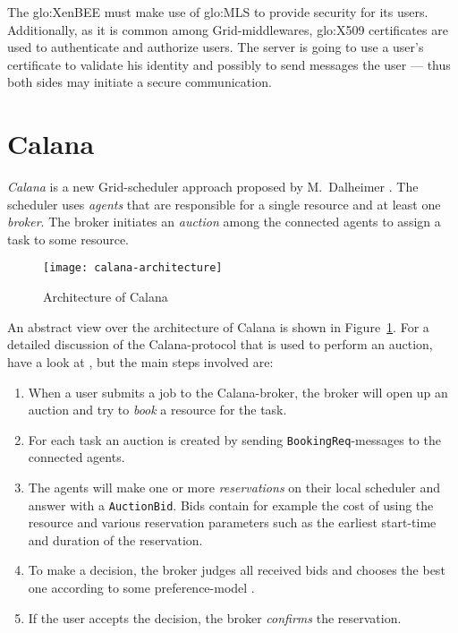 \bigskip

The \gls{glo:XenBEE}  must make use  of \gls{glo:MLS} to  provide security
for  its users.   Additionally, as  it is  common  among Grid-middlewares,
\gls{glo:X509}  certificates  are   used  to  authenticate  and  authorize
users. The  server is going  to use a  user's certificate to  validate his
identity and  possibly to send messages  the user --- thus  both sides may
initiate a secure communication.

\section{Calana}
\label{sec:calana}

\emph{Calana} is  a new  Grid-scheduler approach proposed  by M.~Dalheimer
\cite{dalheimer05agentbased}.  The  scheduler uses \emph{agents}  that are
responsible for  a single  resource and at  least one  \emph{broker}.  The
broker initiates an \emph{auction} among  the connected agents to assign a
task to some resource.

\begin{figure}[htbp]
  \centering
  \texttt{[image: calana-architecture]}
  \caption{Architecture of Calana}
  \label{fig:calana-architecture}
\end{figure}

An  abstract   view  over   the  architecture  of   Calana  is   shown  in
Figure~\ref{fig:calana-architecture}.   For a  detailed discussion  of the
Calana-protocol  that  is used  to  perform an  auction,  have  a look  at
\cite{dalheimer06calanaprotocol,petry06}, but  the  main steps  involved
are:
\begin{enumerate}
\item When a user submits a job to the Calana-broker, the broker will open
  up an auction and try to \emph{book} a resource for the task.
\item    For   each   task    an   auction    is   created    by   sending
  \texttt{BookingReq}-messages to the connected agents.
\item The agents will make  one or more \emph{reservations} on their local
  scheduler  and  answer with  a  \texttt{AuctionBid}.   Bids contain  for
  example  the  cost  of   using  the  resource  and  various  reservation
  parameters  such  as  the   earliest  start-time  and  duration  of  the
  reservation.
\item To make a decision, the  broker judges all received bids and chooses
  the     best     one      according     to     some     preference-model
  \cite{dalheimer05agentbased, petry06}.
\item If  the user  accepts the decision,  the broker  \emph{confirms} the
  reservation.
\end{enumerate}

